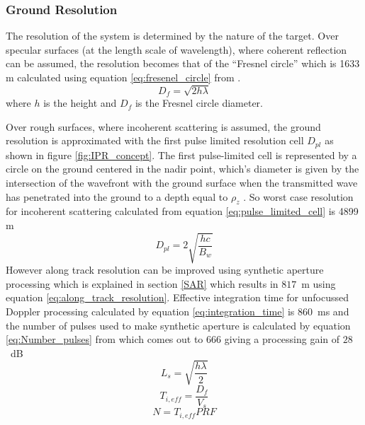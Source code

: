 \subsubsection{Ground Resolution}


The resolution of the system is determined by the nature of the target. Over specular surfaces (at the length scale of wavelength), where coherent reflection can be assumed, the resolution becomes that of the ``Fresnel circle'' which is 1633 m calculated using equation \ref{eq:fresenel_circle} from \cite{SHARAD}.
\begin{equation}
D_{f} = \sqrt{2h\lambda}
\label{eq:fresenel_circle}
\end{equation}
where $h$ is the height and $D_{f}$ is the Fresnel circle diameter.

Over rough surfaces, where incoherent scattering is assumed, the ground resolution is approximated with the first pulse limited resolution cell $D_{pl}$ as shown in figure \ref{fig:IPR_concept}. The first pulse-limited cell is represented by a circle on the ground centered in the nadir point, which's diameter is given by the intersection of the wavefront with the ground surface when the transmitted wave has penetrated into the ground to a depth equal to $\rho_{z}$ \cite{Gany_SRS}. So worst case resolution for incoherent scattering calculated from equation \ref{eq:pulse_limited_cell} is 4899 m 
\begin{equation}
D_{pl} = 2\sqrt{\dfrac{hc}{B_{w}}}
\label{eq:pulse_limited_cell}
\end{equation}
However along track resolution can be improved using synthetic aperture processing which is explained in section \ref{SAR} which results in $817$~m using equation \ref{eq:along_track_resolution}. Effective integration time for unfocussed Doppler processing calculated by equation \ref{eq:integration_time} is $860$~ms and the number of pulses used to make synthetic aperture is calculated by equation \ref{eq:Number_pulses} from \cite{Gany_SRS}  which comes out to 666 giving a processing gain of $28$~dB 
%
\begin{equation}
L_{s} = \sqrt{\dfrac{h\lambda}{2}}
\label{eq:along_track_resolution}
\end{equation}
%
\begin{equation}
T_{i,eff} = \dfrac{D_{f}}{V_{s}}
\label{eq:integration_time}
\end{equation}
\begin{equation}
N = T_{i,eff}PRF 
\label{eq:Number_pulses}
\end{equation}
%
